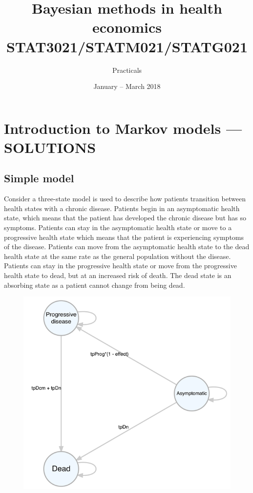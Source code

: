 \documentclass[a4paper,twoside,openany]{../svmonoBUGS}\usepackage[]{graphicx}\usepackage[]{color}
\title{Bayesian methods in health economics \\ STAT3021/STATM021/STATG021}
\author{Practicals}
\date{January -- March 2018}
\begin{document}
\addtocounter{chapter}{7}
\chapter{Introduction to Markov models --- SOLUTIONS}


\section{Simple model}
Consider a three-state model is used to describe how patients transition between health states with a chronic disease.
Patients begin in an asymptomatic health state, which means that the patient has developed the chronic disease but has so symptoms.
Patients can stay in the asymptomatic health state or move to a progressive health state which means that the patient is experiencing symptoms of the disease.
Patients can move from the asymptomatic health state to the dead health state at the same rate as the general population without the disease.
Patients can stay in the progressive health state or move from the progressive health state to dead, but at an increased risk of death.
The dead state is an absorbing state as a patient cannot change from being dead.

\begin{figure}
\centering
\includegraphics[scale=1]{model-diagram}
\end{figure}
\end{document}
